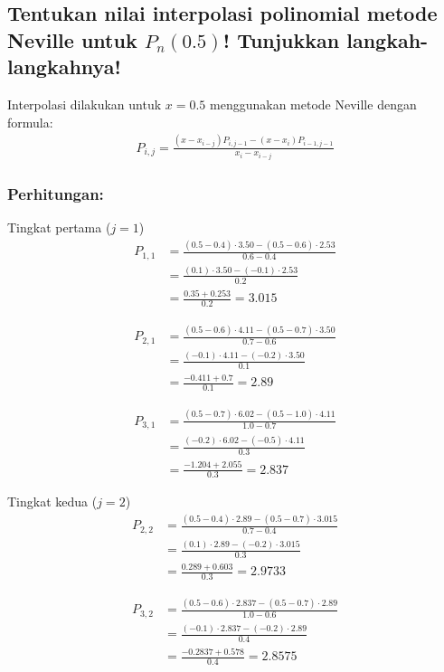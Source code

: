 \documentclass{article}
\begin{document}
\subsection{Tentukan nilai interpolasi polinomial metode Neville untuk $P_n(0.5)$! Tunjukkan langkah-langkahnya!}
Interpolasi dilakukan untuk $x = 0.5$ menggunakan metode Neville dengan formula:
\begin{align*}
    P_{i,j} = \frac{(x - x_{i-j}) P_{i,j-1} - (x - x_i) P_{i-1,j-1}}{x_i - x_{i-j}}
\end{align*}

\subsubsection{Perhitungan:}
Tingkat pertama ($j = 1$)
\begin{align*}
    P_{1,1} &= \frac{(0.5 - 0.4) \cdot 3.50 - (0.5 - 0.6) \cdot 2.53}{0.6 - 0.4} \\
            &= \frac{(0.1) \cdot 3.50 - (-0.1) \cdot 2.53}{0.2} \\
            &= \frac{0.35 + 0.253}{0.2} = 3.015
\end{align*}

\begin{align*}
    P_{2,1} &= \frac{(0.5 - 0.6) \cdot 4.11 - (0.5 - 0.7) \cdot 3.50}{0.7 - 0.6} \\
            &= \frac{(-0.1) \cdot 4.11 - (-0.2) \cdot 3.50}{0.1} \\
            &= \frac{-0.411 + 0.7}{0.1} = 2.89
\end{align*}

\begin{align*}
    P_{3,1} &= \frac{(0.5 - 0.7) \cdot 6.02 - (0.5 - 1.0) \cdot 4.11}{1.0 - 0.7} \\
            &= \frac{(-0.2) \cdot 6.02 - (-0.5) \cdot 4.11}{0.3} \\
            &= \frac{-1.204 + 2.055}{0.3} = 2.837
\end{align*}

Tingkat kedua ($j = 2$)
\begin{align*}
    P_{2,2} &= \frac{(0.5 - 0.4) \cdot 2.89 - (0.5 - 0.7) \cdot 3.015}{0.7 - 0.4} \\
            &= \frac{(0.1) \cdot 2.89 - (-0.2) \cdot 3.015}{0.3} \\
            &= \frac{0.289 + 0.603}{0.3} = 2.9733
\end{align*}

\begin{align*}
    P_{3,2} &= \frac{(0.5 - 0.6) \cdot 2.837 - (0.5 - 0.7) \cdot 2.89}{1.0 - 0.6} \\
            &= \frac{(-0.1) \cdot 2.837 - (-0.2) \cdot 2.89}{0.4} \\
            &= \frac{-0.2837 + 0.578}{0.4} = 2.8575
\end{align*}
\end{document}
